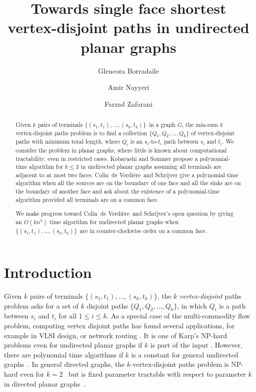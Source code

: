 \documentclass[11pt,twoside]{article}
\title{Towards single face shortest vertex-disjoint paths in undirected planar graphs}
\author{Glencora Borradaile}
\author{Amir Nayyeri}
\author{Farzad Zafarani}
\affil{School of Electrical Engineering and Computer Science \\ Oregon State University\\
	\{glencora, nayyeria, zafaranf\}@eecs.oregonstate.edu}
\newcommand{\EMPH}[1]{\emph{#1}}
\newcommand{\terminals}{$\{(s_{1}, t_{1}), \ldots, (s_{k}, t_{k})\}$}
\newcommand{\opts}{$\{\opt{1}, \opt{2}, \ldots, \opt{k}\}$}
\newcommand{\opt}[1]{Q_{#1}}
\newcommand{\eric}{Colin~de Verdi{\`e}re}
\begin{document}
\maketitle

\begin{abstract}
Given $k$ pairs of terminals \terminals\ in a graph $G$, the min-sum $k$ vertex-disjoint paths problem is to find a collection $\{\opt{1}, \opt{2}, \ldots, \opt{k}\}$ of vertex-disjoint paths with minimum total length, where $\opt{i}$ is an $s_i$-to-$t_i$ path between $s_i$ and $t_i$.  We consider the problem in planar graphs, where little is known about computational tractability, even in restricted cases. Kobayashi and Sommer propose a polynomial-time algorithm for $k \le 3$ in undirected planar graphs assuming all terminals are adjacent to at most two faces.
\eric\ and Schrijver give a polynomial-time algorithm when all the sources are on the boundary of one face and all the sinks are on the boundary of another face and ask about the existence of a polynomial-time algorithm provided all terminals are on a common face.  

We make progress toward \eric\ and Schrijver's open question by giving an $O(kn^5)$ time algorithm for undirected planar graphs when \terminals\ are in counter-clockwise order on a common face.
\end{abstract}

\newpage
\section{Introduction}

Given $k$ pairs of terminals \terminals, the \EMPH{$k$ vertex-disjoint} paths problem asks for a set of $k$ disjoint paths \opts, in which $\opt{i}$ is a path between $s_i$ and $t_i$ for all $1\leq i\leq k$.
As a special case of the multi-commodity flow problem, computing vertex disjoint paths has found several applications, for example in VLSI design\cite{kramer1984complexity}, or network routing \cite{ogier1993distributed,srinivas2005finding}.  
It is one of Karp's NP-hard problems \cite{karp1974} even for undirected planar graphs if $k$ is part of the input \cite{middendorf1993disjPathComplexity}.  
However, there are polynomial time algorithms if $k$ is a constant for general undirected graphs~\cite{robertson1995graph, Kawarabayashi2010shorterProofGraphMinorAlg}.
In general directed graphs, the $k$-vertex-disjoint paths problem is NP-hard even for $k = 2$~\cite{fortune1980directedSubGraphHom} but is fixed parameter tractable with respect to parameter $k$ in directed planar graphs~\cite{schrijver1994finding, cygan2013planarDirDisjFPT}.
\end{document}
